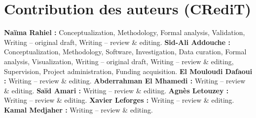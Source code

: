 \ifanonyme\else
\section*{Contribution des auteurs (CRediT)}

\textbf{Naïma Rahiel :} Conceptualization, Methodology, Formal analysis, Validation, Writing -- original draft, Writing -- review \& editing.
\textbf{Sid-Ali Addouche :} Conceptualization, Methodology, Software, Investigation, Data curation, Formal analysis, Visualization, Writing -- original draft, Writing -- review \& editing, Supervision, Project administration, Funding acquisition.
\textbf{El Mouloudi Dafaoui :} Writing -- review \& editing.
\textbf{Abderrahman El Mhamedi :} Writing -- review \& editing.
\textbf{Saïd Amari :} Writing -- review \& editing.
\textbf{Agnès Letouzey :} Writing -- review \& editing.
\textbf{Xavier Leforges :} Writing -- review \& editing.
\textbf{Kamal Medjaher :} Writing -- review \& editing.
\fi
